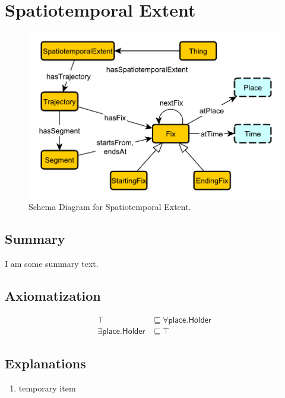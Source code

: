 \section{Spatiotemporal Extent}
\label{sec:Spatiotemporal}
\begin{figure}[h!]
\begin{center}
\includegraphics[width=.8\textwidth]{figures/ste}
\end{center}
\caption{Schema Diagram for Spatiotemporal Extent.}
\label{fig:Spatiotemporal}
\end{figure}
\subsection{Summary}
\label{sum:Spatiotemporal}
I am some summary text.

\subsection{Axiomatization}
\label{axs:Spatiotemporal}
\begin{align}
\top &\sqsubseteq \forall\textsf{place.Holder} \\ 
\exists\textsf{place.Holder} &\sqsubseteq \top 
\end{align}

\subsection{Explanations}
\label{exp:Spatiotemporal}
\begin{enumerate}
\item temporary item
\end{enumerate}

